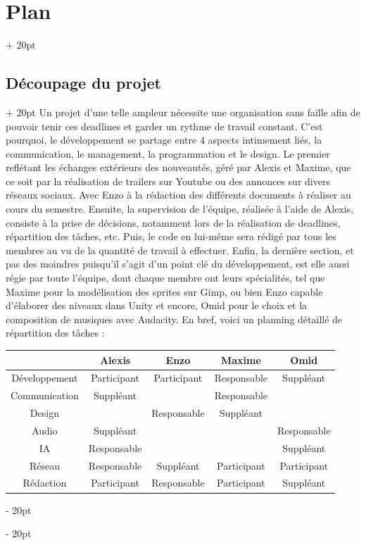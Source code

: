 \documentclass[a4paper, 12pt, twoside]{article}
\newcommand{\ind}[1][20pt]{\advance\leftskip + #1}
\newcommand{\deind}[1][20pt]{\advance\leftskip - #1}
\newenvironment{indt}[2][20pt]{#2 \par \ind[#1]}{\par \deind} %
\begin{document}
\begin{indt}{\section{Plan}}
        \begin{indt}{\subsection{Découpage du projet}}
            Un projet d'une telle ampleur nécessite une organisation sans faille afin de pouvoir tenir ces deadlines et garder un rythme de travail constant. C'est pourquoi, le développement se partage entre 4 aspects intimement liés, la communication, le management, la programmation et le design. Le premier reflétant les échanges extérieurs des nouveautés, géré par Alexis et Maxime, que ce soit par la réalisation de trailers sur Youtube ou des annonces sur divers réseaux sociaux. Avec Enzo à la rédaction des différents documents à réaliser au cours du semestre. Ensuite, la supervision de l'équipe, réalisée à l'aide de Alexis, consiste à la prise de décisions, notamment lors de la réalisation de deadlines, répartition des tâches, etc. Puis, le code en lui-même sera rédigé par tous les membres au vu de la quantité de travail à effectuer. Enfin, la dernière section, et pas des moindres puisqu'il s'agit d'un point clé du développement, est elle aussi régie par toute l'équipe, dont chaque membre ont leurs spécialités, tel que Maxime pour la modélisation des sprites sur Gimp, ou bien Enzo capable d'élaborer des niveaux dans Unity et encore, Omid pour le choix et la composition de musiques avec Audacity. En bref, voici un planning détaillé de répartition des tâches :
            \begin{center}
                \begin{tabular}{|c|c|c|c|c|}
                    \hline
                    & Alexis & Enzo & Maxime & Omid
                    \\
                    \hline
                    Développement & Participant & Participant & Responsable & Suppléant
                    \\
                    \hline
                    Communication & Suppléant & & Responsable &
                    \\
                    \hline
                    Design & & Responsable & Suppléant &
                    \\
                    \hline
                    Audio & Suppléant & & & Responsable
                    \\
                    \hline
                    IA & Responsable & & & Suppléant
                    \\
                    \hline
                    Réseau & Responsable & Suppléant & Participant & Participant
                    \\
                    \hline
                    Rédaction & Participant & Responsable & Participant & Suppléant
                    \\
                    \hline
                \end{tabular}
            \end{center}
        
        \end{indt}

    \end{indt}
\end{document}

